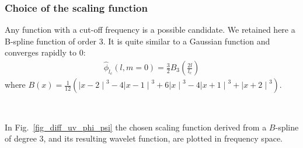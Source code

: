 \subsubsection*{Choice of the scaling function}
Any function with a cut-off frequency is a possible candidate. We retained here a B-spline function of order 3. It is quite similar to a 
Gaussian function and converges rapidly to $0$:
\begin{eqnarray}
\hat \phi_{l_c} (l,m = 0) =\frac{3}{2} B_{3}( \frac{2 l}{l_{c} })  %
\end{eqnarray}
where $B(x) = \frac{1}{12}({\mid{x-2}\mid}^3 - 4 {\mid{x-1}\mid}^3 + 6 {\mid{x}\mid}^3 - 4 {\mid{x+1}\mid}^3 + {\mid{x+2}\mid}^3)$.

\begin{figure*}[htb]
\centerline{
\hbox{
}}
\caption{On the left, the scaling function $\hat{\phi}$ and, on the 
right, the wavelet function $\hat{\psi}$.}
\label{fig_diff_uv_phi_psi}
\end{figure*}

In Fig.~\ref{fig_diff_uv_phi_psi} the chosen scaling function derived from a $B$-spline of degree 3, and its resulting wavelet function, are plotted in frequency space.


